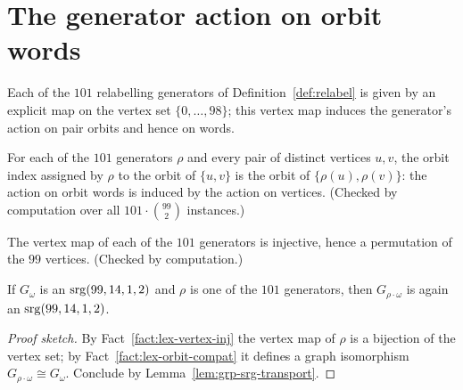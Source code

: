 \section{The generator action on orbit words}

\begin{definition}\label{def:lex-vertex-action}
Each of the $101$ relabelling generators of Definition~\ref{def:relabel} is
given by an explicit map on the vertex set $\{0,\dots,98\}$; this vertex map
induces the generator's action on pair orbits and hence on words.
\leanok
{}
\end{definition}

\begin{fact}\label{fact:lex-orbit-compat}
For each of the $101$ generators $\rho$ and every pair of distinct vertices
$u,v$, the orbit index assigned by $\rho$ to the orbit of $\{u,v\}$ is the
orbit of $\{\rho(u),\rho(v)\}$: the action on orbit words is induced by the
action on vertices.  (Checked by computation over all $101 \cdot
\binom{99}{2}$ instances.)
\leanok
{}
\end{fact}

\begin{fact}\label{fact:lex-vertex-inj}
The vertex map of each of the $101$ generators is injective, hence a
permutation of the $99$ vertices.  (Checked by computation.)
\leanok
{}
\end{fact}

\begin{lemma}\label{lem:lex-step-srg}
If $G_\omega$ is an $\mathrm{srg}(99,14,1,2)$ and $\rho$ is one of the $101$
generators, then $G_{\rho\cdot\omega}$ is again an $\mathrm{srg}(99,14,1,2)$.
\leanok
{}
\end{lemma}

\begin{proof}[Proof sketch]
By Fact~\ref{fact:lex-vertex-inj} the vertex map of $\rho$ is a bijection of
the vertex set; by Fact~\ref{fact:lex-orbit-compat} it defines a graph
isomorphism $G_{\rho\cdot\omega} \cong G_\omega$.  Conclude by
Lemma~\ref{lem:grp-srg-transport}.
\end{proof}

